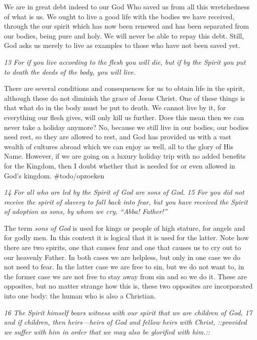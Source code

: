 We are in great debt indeed to our God Who saved us from all this
wretchedness of what is us. We ought to live a good life with the bodies
we have received, through the our spirit which has now been renewed and
has been separated from our bodies, being pure and holy. We will never
be able to repay this debt. Still, God asks us merely to live as
examples to those who have not been saved yet.

\emph{13 For if you live according to the flesh you will die, but if by
the Spirit you put to death the deeds of the body, you will live.}

There are several conditions and consequences for us to obtain life in
the spirit, although these do not diminish the grace of Jesus Christ.
One of these things is that what do in the body must be put to death. We
cannot live by it, for everything our flesh gives, will only kill us
further. Does this mean then we can never take a holiday anymore? No,
because we still live in our bodies, our bodies need rest, so they are
allowed to rest, and God has provided us with a vast wealth of cultures
abroad which we can enjoy as well, all to the glory of His Name.
However, if we are going on a luxury holiday trip with no added benefits
for the Kingdom, then I doubt whether that is needed for or even allowed
in God's kingdom. \#todo/opzoeken

\emph{14 For all who are led by the Spirit of God are sons of God. 15
For you did not receive the spirit of slavery to fall back into fear,
but you have received the Spirit of adoption as sons, by whom we cry,
``Abba! Father!''}

The term \emph{sons of God} is used for kings or people of high stature,
for angels and for godly men. In this context it is logical that it is
used for the latter. Note how there are two spirits, one that causes
fear and one that causes us to cry out to our heavenly Father. In both
cases we are helpless, but only in one case we do not need to fear. In
the latter case we are free to sin, but we do not want to, in the former
case we are not free to stay away from sin and so we do it. These are
opposites, but no matter strange how this is, these two opposites are
incorporated into one body: the human who is also a Christian.

\emph{16 The Spirit himself bears witness with our spirit that we are
children of God, 17 and if children, then heirs---heirs of God and
fellow heirs with Christ, ::provided we suffer with him in order that we
may also be glorified with him.::}

